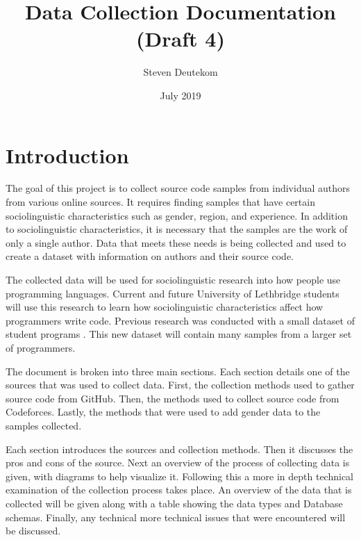 \documentclass{article}
\begin{document}
\title{Data Collection Documentation (Draft 4)}
\author{Steven Deutekom}
\date{July 2019}
\maketitle


\newpage
\tableofcontents

\newpage
\listoffigures
\listoftables


\newpage
\section{Introduction}
The goal of this project is to collect source code samples from individual authors from various online sources. It requires finding samples that have certain sociolinguistic characteristics such as gender, region, and experience. In addition to sociolinguistic characteristics, it is necessary that the samples are the work of only a single author. Data that meets these needs is being collected and used to create a dataset with information on authors and their source code.

The collected data will be used for sociolinguistic research into how people use programming languages. Current and future University of Lethbridge students will use this research to learn how sociolinguistic characteristics affect how programmers write code. Previous research was conducted with a small dataset of student programs \cite{Naz2015} \cite{Rafee2017}. This new dataset will contain many samples from a larger set of programmers.

The document is broken into three main sections. Each section details one of the sources that was used to collect data. First, the collection methods used to gather source code from GitHub. Then, the methods used to collect source code from Codeforces. Lastly, the methods that were used to add gender data to the samples collected.

Each section introduces the sources and collection methods. Then it discusses the pros and cons of the source. Next an overview of the process of collecting data is given, with diagrams to help visualize it. Following this a more in depth technical examination of the collection process takes place. An overview of the data that is collected will be given along with a table showing the data types and Database schemas. Finally, any technical more technical issues that were encountered will be discussed.
\end{document}
